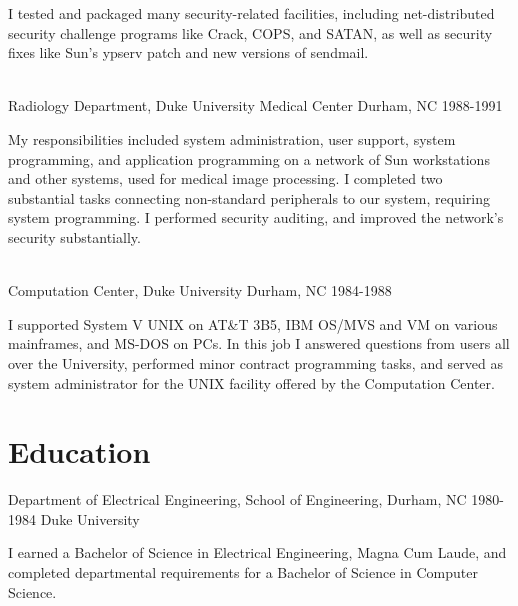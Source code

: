 \documentclass[12pt,letterpaper]{article}
\begin{document}
I tested and packaged many security-related facilities, including
net-distributed security challenge programs like Crack, COPS, and
SATAN, as well as security fixes like Sun's ypserv patch and new
versions of sendmail.
\\~

Radiology Department, Duke University Medical Center \hfill Durham, NC
1988-1991

My responsibilities included system administration, user support,
system programming, and application programming on a network of Sun
workstations and other systems, used for medical image processing. I
completed two substantial tasks connecting non-standard peripherals
to our system, requiring system programming. I performed security
auditing, and improved the network's security substantially.
\\~

Computation Center, Duke University \hfill Durham, NC
1984-1988

I supported System V UNIX on AT\&T 3B5, IBM OS/MVS and VM on various
mainframes, and MS-DOS on PCs. In this job I answered questions from
users all over the University, performed minor contract programming
tasks, and served as system administrator for the UNIX facility
offered by the Computation Center.
\section*{Education}
Department of Electrical Engineering, School of Engineering, Durham, NC
1980-1984 \hfill Duke University

I earned a Bachelor of Science in Electrical Engineering, Magna
Cum Laude, and completed departmental requirements for a Bachelor
of Science in Computer Science.
\end{document}
